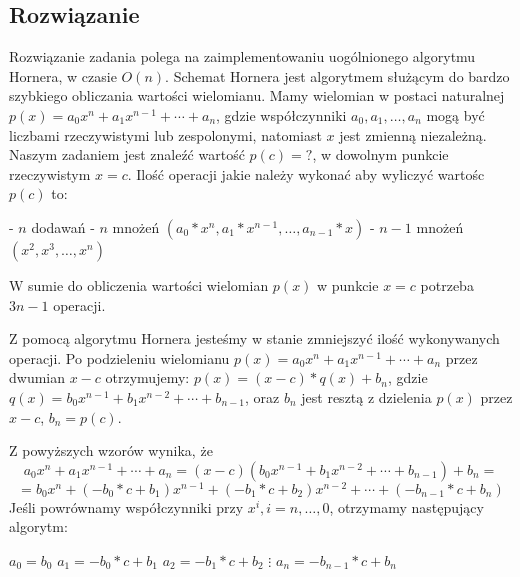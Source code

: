 \documentclass{article}
\begin{document}
\begin{center}
    \subsection{Rozwiązanie}
    \large Rozwiązanie zadania polega na zaimplementowaniu uogólnionego algorytmu Hornera, w czasie \(O(n)\). \newline
     Schemat Hornera jest algorytmem służącym do bardzo szybkiego obliczania wartości wielomianu. \newline
     Mamy wielomian w postaci naturalnej \(p(x)=a_{0}x^n+a_{1}x^{n-1}+\cdots+a_{n}\), gdzie współczynniki \(a_{0},a_{1},\dots,a_{n}\)
     mogą być liczbami rzeczywistymi lub zespolonymi, natomiast \(x\) jest zmienną niezależną. \newline
     Naszym zadaniem jest znaleźć wartość \(p(c)=?\), w dowolnym punkcie rzeczywistym \(x=c\). \newline
     \newpage
     Ilość operacji jakie należy wykonać aby wyliczyć wartośc \(p(c)\) to: \newline
     \begin{flushleft}
        - \(n\) dodawań \newline
        - \(n\) mnożeń \((a_{0}*x^n,a_{1}*x^{n-1},\dots,a_{n-1}*x)\) \newline
        - \(n-1\) mnożeń \((x^2, x^3,\dots,x^n)\) \newline
     \end{flushleft}
     W sumie do obliczenia wartości wielomian \(p(x)\) w punkcie \(x=c\) potrzeba \(3n-1\) operacji. \newline

     Z pomocą algorytmu Hornera jesteśmy w stanie zmniejszyć ilość wykonywanych operacji. \newline 
     Po podzieleniu wielomianu \(p(x)=a_{0}x^n+a_{1}x^{n-1}+\cdots+a_{n}\) przez dwumian \(x-c\) otrzymujemy: \newline
     \(p(x)=(x-c)*q(x)+b_{n}\), gdzie \(q(x)=b_{0}x^{n-1}+b_{1}x^{n-2}+\cdots+b_{n-1}\), \newline oraz \(b_{n}\) jest resztą z dzielenia \(p(x)\) przez \(x-c\), \(b_{n}=p(c)\). \newline

     Z powyższych wzorów wynika, że \newline
     \[a_{0}x^n+a_{1}x^{n-1}+\cdots+a_{n}=(x-c)(b_{0}x^{n-1}+b_{1}x^{n-2}+\cdots+b_{n-1})+b_{n}=\]
     \[=b_{0}x^n+(-b_{0}*c+b_{1})x^{n-1}+(-b_{1}*c+b_{2})x^{n-2}+\cdots+(-b_{n-1}*c+b_{n})\] \newline
     Jeśli powrównamy współczynniki przy \(x^i, i = n,\ldots,0\), otrzymamy następujący algorytm: \newline
     \begin{flushleft}
        \(a_{0}=b_{0}\) \newline
        \(a_{1}=-b_{0}*c+b_{1}\) \newline
        \(a_{2}=-b_{1}*c+b_{2}\) \newline
        \(\vdots\) \newline
        \(a_{n}=-b_{n-1}*c+b_{n}\) \newline


\end{flushleft}
\end{center}
\end{document}
